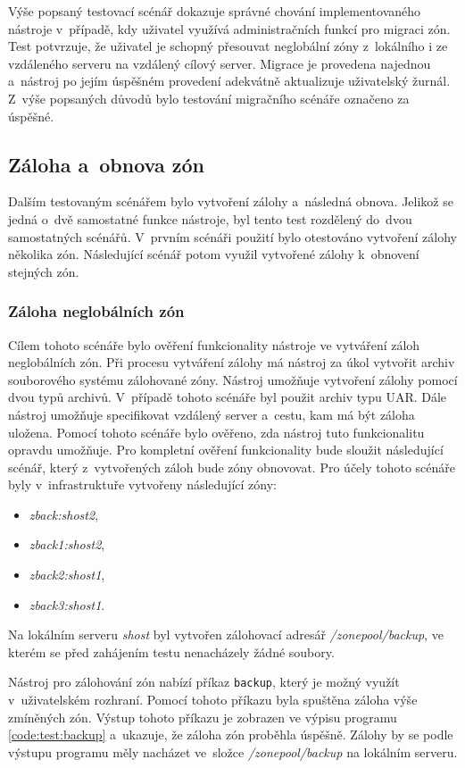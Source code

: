 Výše popsaný testovací scénář dokazuje správné chování implementovaného nástroje v~případě, kdy uživatel využívá administračních
funkcí pro migraci zón. Test potvrzuje, že uživatel je schopný přesouvat neglobální zóny z~lokálního i ze vzdáleného serveru
na vzdálený cílový server. Migrace je provedena najednou a~nástroj po jejím úspěšném provedení adekvátně aktualizuje uživatelský žurnál.
Z~výše popsaných důvodů bylo testování migračního scénáře označeno za úspěšné.
\subsection{Záloha a~obnova zón}
\label{chapter:testing:scenario:backup_recovery}
Dalším testovaným scénářem bylo vytvoření zálohy a~následná obnova. Jelikož se jedná o~dvě samostatné funkce nástroje, byl
tento test rozdělený do~dvou samostatných scénářů. V~prvním scénáři použití bylo otestováno vytvoření zálohy několika zón. 
Následující scénář potom využil vytvořené zálohy k~obnovení stejných zón.
\subsubsection{Záloha neglobálních zón}
\label{chapter:testing:scenario:backup_recovery:backup}
Cílem tohoto scénáře bylo ověření funkcionality nástroje ve vytváření záloh neglobálních zón. Při procesu vytváření zálohy má
nástroj za úkol vytvořit archiv souborového systému zálohované zóny. Nástroj umožňuje vytvoření zálohy pomocí dvou typů archivů.
V~případě tohoto scénáře byl použit archiv typu UAR. Dále nástroj umožňuje specifikovat vzdálený server a~cestu, kam má být
záloha uložena. Pomocí tohoto scénáře bylo ověřeno, zda nástroj tuto funkcionalitu opravdu umožňuje. Pro kompletní ověření
funkcionality bude sloužit následující scénář, který z~vytvořených záloh bude zóny obnovovat. Pro účely tohoto scénáře byly
v~infrastruktuře vytvořeny následující zóny:
\begin{itemize}
 \item \textit{zback:shost2},
 \item \textit{zback1:shost2},
 \item \textit{zback2:shost1},
 \item \textit{zback3:shost1}.
\end{itemize}
Na lokálním serveru \textit{shost} byl vytvořen zálohovací adresář \textit{/zonepool/backup}, ve kterém se před zahájením
testu nenacházely žádné soubory.

Nástroj pro zálohování zón nabízí příkaz \verb|backup|, který je možný využít v~uživatelském rozhraní. Pomocí tohoto příkazu byla
spuštěna záloha výše zmíněných zón. Výstup tohoto příkazu je zobrazen ve výpisu programu \ref{code:test:backup} a~ukazuje, že záloha
zón proběhla úspěšně. Zálohy by se podle výstupu programu měly nacházet ve~složce \textit{/zonepool/backup} na lokálním serveru.


